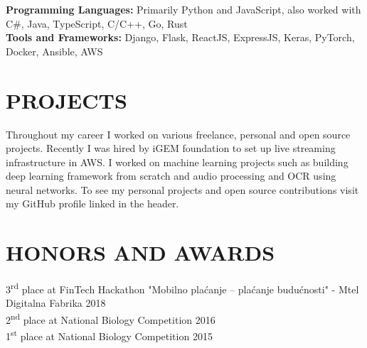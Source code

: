 \documentclass[paper=letter,fontsize=11pt]{scrartcl}
\newcommand{\NewPart}[2]{\section*{\uppercase{#1} \small \normalfont #2}}
\newcommand{\Language}[2]{
        \noindent \textbf{#1}
        \noindent \small \textit{#2}}
\begin{document}
\Language{Programming Languages:}{}{Primarily Python and JavaScript, also worked with
C\#, Java, TypeScript, C/C++, Go, Rust}\\
\Language{Tools and Frameworks:}{}{Django, Flask, ReactJS, ExpressJS, Keras, PyTorch, Docker, Ansible, AWS}

\NewPart{Projects}{}

Throughout my career I worked on various freelance, personal and open source projects.
Recently I was hired by iGEM foundation to set up live streaming infrastructure in AWS.
I worked on machine learning projects such as building deep learning framework from
scratch and audio processing and OCR using neural networks. To see my personal
projects and open source contributions visit my GitHub profile linked in the header.

\NewPart{Honors and Awards}{}

3\textsuperscript{rd} place at FinTech Hackathon "Mobilno plaćanje – plaćanje budućnosti" - Mtel Digitalna Fabrika \hfill {2018}\\
2\textsuperscript{nd} place at National Biology Competition \hfill {2016}\\
1\textsuperscript{st} place at National Biology Competition \hfill {2015}
\end{document}
